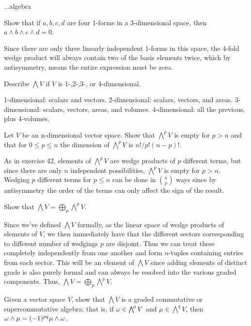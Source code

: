{...algebra

\begin{p}{Show that if $a,b,c,d$ are four 1-forms in a 3-dimensional space, then $a\wedge b\wedge c\wedge d=0$.}
\end{p}

Since there are only three linearly independent 1-forms in this space, the 4-fold wedge product will always contain two of the basis
elements twice, which by antisymmetry, means the entire expression must be zero.

\begin{p}{Describe $\bigwedge V$ if $V$ is 1-,2-,3-, or 4-dimensional.}
\end{p}

1-dimensional: scalars and vectors. 2-dimensional: scalars, vectors, and areas. 3-dimensional: scalars, vectors, areas, and volumes. 4-dimensional:
all the previous, plus 4-volumes.

\begin{p}{Let $V$ be an n-dimensional vector space. Show that $\bigwedge^{\!p} V$ is empty for $p>n$ and that for $0\leq p\leq n$ the dimension of $\bigwedge^{\!p} V$ is $n!/p!(n-p)!$.}
\end{p}

As in exercise 42, elements of $\bigwedge^{\!p} V$ are wedge products of $p$ different terms, but since there are only $n$ independent possibilities,
$\bigwedge^{\!p} V$ is empty for $p>n$. Wedging $p$ different terms for $p\leq n$ can be done in $\binom{n}{p}$ ways since by antisymmetry 
the order of the terms can only affect the sign of the result.

\begin{p}
{Show that $\bigwedge V=\bigoplus_p \bigwedge^{\!p} V$.}
\end{p}

Since we've defined $\bigwedge V$ formally, as the linear space of wedge products of elements of $V$, we then immediately have
that the different sectors corresponding to different number of wedgings $p$ are disjoint. Thus we can treat these 
completely independently from one another and form $n$-tuples containing entries from each sector. This will be an element of
$\bigwedge V$ since adding elements of distinct grade is also purely formal and can always be resolved into the various
graded components. Thus, $\bigwedge V=\bigoplus_p \bigwedge^{\!p} V$.

\begin{p}{Given a vector space $V$, show that $\bigwedge V$ is a graded commutative or supercommutative algebra;
that is, if $\omega\in \bigwedge^{\!p}V$ and $\mu\in\bigwedge^{\!q}V$, then $\omega\wedge\mu=(-1)^{pq}\mu\wedge\omega$.}
\end{p}

}

